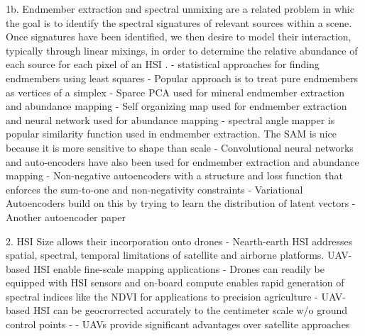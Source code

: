 \documentclass[remotesensing,article,submit,pdftex,moreauthors]{Definitions/mdpi}
\begin{document}
1b. Endmember extraction and spectral unmixing are a related problem in whic the goal is to identify the spectral signatures of relevant sources within a scene. Once signatures have been identified, we then desire to model their interaction, typically through linear mixings, in order to determine the relative abundance of each source for each pixel of an HSI \cite{spectral-unmixing-orig, heylen2014review}.
    - statistical approaches for finding endmembers using least squares \cite{berman2004ice}
    - Popular approach is to treat pure endmembers as vertices of a simplex \cite{plaza2012endmember, nascimento2005vertex}
    - Sparce PCA used for mineral endmember extraction and abundance mapping \cite{yousefi2016mineral}
    - Self organizing map used for endmember extraction and neural network used for abundance mapping \cite{cantero2004analysis}
    - spectral angle mapper is popular similarity function used in endmember extraction. The SAM is nice because it is more sensitive to shape than scale \cite{jiang2020classification}
    - Convolutional neural networks and auto-encoders have also been used for endmember extraction and abundance mapping \cite{palsson2020convolutional}
    - Non-negative autoencoders with a structure and loss function that enforces the sum-to-one and non-negativity constraints \cite{non-negative-autoencoders}
    - Variational Autoencoders build on this by trying to learn the distribution of latent vectors \cite{su2019daen}
    - Another autoencoder paper \cite{borsoi2019deep}
    
    
    
2. HSI Size allows their incorporation onto drones
    -  Nearth-earth HSI addresses spatial, spectral, temporal limitations of satellite and airborne platforms. UAV-based HSI enable fine-scale mapping applications \cite{banerjee2020uav}
    - Drones can readily be equipped with HSI sensors and on-board compute enables rapid generation of spectral indices like the NDVI for applications to precision agriculture \cite{horstrand2019uav}
    - UAV-based HSI can be geocrorrected accurately to the centimeter scale w/o ground control points \cite{arroyo2019implementation}
    - \cite{robot-team-1}
    - UAVs provide significant advantages over satellite approaches \cite{adao2017hyperspectral}
\end{document}
